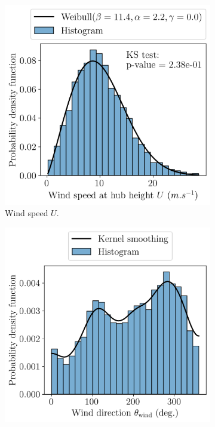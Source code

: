 \begin{figure}
    \centering
    \begin{subfigure}[b]{0.32\textwidth}
        \centering
        \includegraphics[width=\linewidth]{../numerical_experiments/chapter3/figures/free_wsp_distribution_SB.png}
        \caption{Wind speed $U$.}
    \end{subfigure}
    \begin{subfigure}[b]{0.32\textwidth}
        \centering
        \includegraphics[width=\linewidth]{../numerical_experiments/chapter3/figures/wind_dir_distribution_SB.png}

\end{subfigure}
\end{figure}
